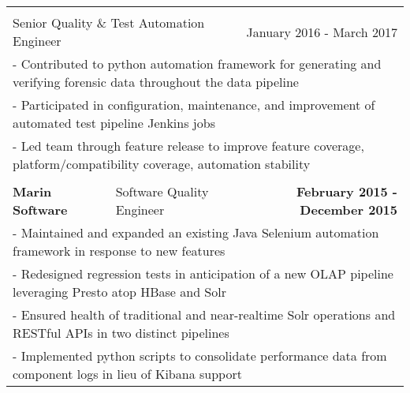 \documentclass[letterpaper]{article}
\begin{document}
\begin{center}
\begin{tabular}{p{}p{}r}
		  \\
		  \\
			  \multicolumn{2}{p{0.5\textwidth}}{\quad Senior Quality \& Test Automation Engineer}
			  &
			  {January 2016 - March 2017 \quad\quad\quad\quad}
		  \\
			  \multicolumn{3}{p{\textwidth}}{\quad\quad - Contributed to python automation framework for generating and verifying forensic data throughout the data pipeline} 
		  \\
			  \multicolumn{3}{p{\textwidth}}{\quad\quad - Participated in configuration, maintenance, and improvement of automated test pipeline Jenkins jobs}
		  \\
			  \multicolumn{3}{p{\textwidth}}{\quad\quad - Led team through feature release to improve feature coverage, platform/compatibility coverage, automation stability}  
		  \\
		  \\
				\textbf{Marin Software}									&
				Software Quality Engineer										&
				\textbf{February 2015 - December 2015 \quad}
			\\
				\multicolumn{3}{p{\textwidth}}{\quad\quad - Maintained and expanded an existing Java Selenium automation framework in response to new features} 
			\\
				\multicolumn{3}{p{\textwidth}}{\quad\quad - Redesigned regression tests in anticipation of a new OLAP pipeline leveraging Presto atop HBase and Solr} 
			\\
				\multicolumn{3}{p{\textwidth}}{\quad\quad - Ensured health of traditional and near-realtime Solr operations and RESTful APIs in two distinct pipelines } 
			\\
				\multicolumn{3}{p{\textwidth}}{\quad\quad - Implemented python scripts to consolidate performance data from component logs in lieu of Kibana support } 

\end{tabular}
\end{center}
\end{document}
